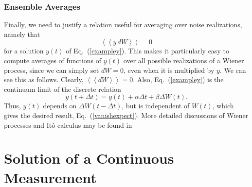 \documentclass[12pt,aps,onecolum,superscriptaddress,footinbib,floatfix,showpacs]{revtex4-1}
\newcommand{\dlangle}{\left\langle\!\left\langle}
\newcommand{\drangle}{\right\rangle\!\right\rangle}
\def\dexpct#1{\dlangle{#1}\drangle}
\begin{document}
\subsubsection{Ensemble Averages}
\label{section:ensembleaveragees}

Finally, we need to justify a relation useful for averaging over
noise realizations, namely that
\begin{equation}
  \dexpct{y\,dW}=0
  \label{vanishexpect}
\end{equation} 
for a solution $y(t)$ of Eq.~(\ref{exampley}). This makes it particularly 
easy to compute averages of functions of $y(t)$ over all possible 
realizations of a Wiener process, 
since we can simply set $dW=0$, even when it is multiplied 
by $y$.  We can see this as follows. Clearly, $\dexpct{dW}=0$. Also, 
Eq.~(\ref{exampley}) is the continuum limit of the discrete relation
\begin{equation}
  y(t+\Delta t) = y(t) +  \alpha\Delta t + \beta\Delta W(t).
\end{equation}
Thus, $y(t)$ depends on $\Delta W(t-\Delta t)$, but is
independent of $W(t)$, which gives the desired result,
Eq.~(\ref{vanishexpect}).  More detailed discussions of Wiener 
processes and It\^o calculus may be found in~\cite{WienerIntroPaper,gardiner}




\section{Solution of a Continuous Measurement}
\label{section:solution}
\end{document}
